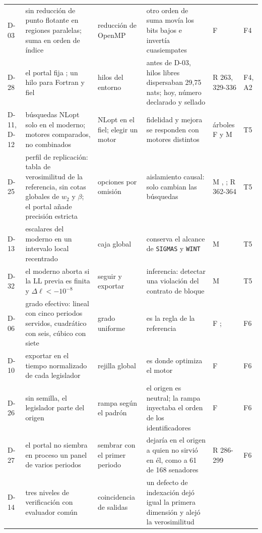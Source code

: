 {\begin{longtable}{L{0.85cm}L{3.1cm}L{2.2cm}L{3.2cm}L{2.25cm}L{0.95cm}}
D-03 & sin reducción de punto flotante en regiones paralelas; suma en orden de índice &
reducción de OpenMP & otro orden de suma movía los bits bajos e invertía cuasiempates & F
 & F4 \\
D-28 & el portal fija ; un hilo para Fortran y fiel & hilos del
entorno & antes de D-03, hilos libres dispersaban 29,75 nats; hoy, número declarado y sellado & R 263, 329-336 &
F4, A2 \\
D-11, D-12 & búsquedas NLopt solo en el moderno; motores comparados, no
combinados & NLopt en el fiel; elegir un motor & fidelidad y mejora se responden con motores
distintos & árboles F y M & T5 \\
D-25 & perfil de replicación: tabla de verosimilitud de la referencia, sin cotas globales de
$w_2$ y $\beta$; el portal añade precisión estricta & opciones por omisión & aislamiento
causal: solo cambian las búsquedas & M ,
; R 362-364 & T5 \\
D-13 & escalares del moderno en un intervalo local recentrado & caja global & conserva el
alcance de \texttt{SIGMAS} y \texttt{WINT} & M  & T5 \\
D-32 & el moderno aborta si la LL previa es finita y $\Delta\ell<-10^{-8}$ & seguir y exportar &
inferencia: detectar una violación del contrato de bloque & M  & T5 \\
D-06 & grado efectivo: lineal con cinco periodos servidos, cuadrático con seis, cúbico con
siete & grado uniforme & es la regla de la referencia & F ;
 & F6 \\
D-10 & exportar en el tiempo normalizado de cada legislador & rejilla global & es donde
optimiza el motor & F  & F6 \\
D-26 & sin semilla, el legislador parte del origen & rampa según el padrón & el origen es
neutral; la rampa inyectaba el orden de los identificadores & F
 & F6 \\
D-27 & el portal no siembra en proceso un panel de varios periodos & sembrar con el primer
periodo & dejaría en el origen a quien no sirvió en él, como a 61 de 168 senadores & R 286-299
& F6 \\
D-14 & tres niveles de verificación con evaluador común & coincidencia de salidas & un defecto
de indexación dejó igual la primera dimensión y alejó la verosimilitud &

\end{longtable}}
